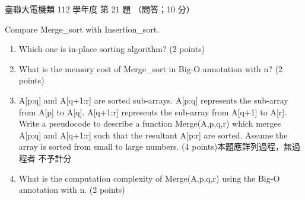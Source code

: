 \begin{pastexam}[label={px:ust-112-ee-ds-21}]{臺聯大電機類 112 學年度 第 21 題}
（問答；10 分）

Compare Merge\_sort with Insertion\_sort.
\begin{enumerate}[label=(\Alph*)]
\item Which one is in-place sorting algorithm? (2 points)
\item What is the memory cost of Merge\_sort in Big-O annotation with n? (2 points)
\item A[p:q] and A[q+1:r] are sorted sub-arrays. A[p:q] represents the sub-array from A[p] to
A[q]. A[q+1:r] represents the sub-array from A[q+1] to A[r]. Write a pseudocode to describe a
function Merge(A,p,q,r) which merges A[p:q] and A[q+1:r] such that the resultant A[p:r] are sorted.
Assume the array is sorted from small to large numbers. (4 points)\quad 本題應詳列過程，無過程者
不予計分
\item What is the computation complexity of Merge(A,p,q,r) using the Big-O annotation with n.
(2 points)
\end{enumerate}
\end{pastexam}

